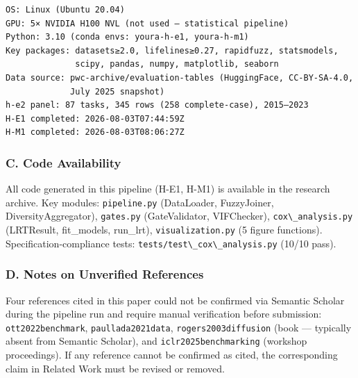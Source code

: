 \begin{verbatim}
OS: Linux (Ubuntu 20.04)
GPU: 5× NVIDIA H100 NVL (not used — statistical pipeline)
Python: 3.10 (conda envs: youra-h-e1, youra-h-m1)
Key packages: datasets≥2.0, lifelines≥0.27, rapidfuzz, statsmodels,
              scipy, pandas, numpy, matplotlib, seaborn
Data source: pwc-archive/evaluation-tables (HuggingFace, CC-BY-SA-4.0,
             July 2025 snapshot)
h-e2 panel: 87 tasks, 345 rows (258 complete-case), 2015–2023
H-E1 completed: 2026-08-03T07:44:59Z
H-M1 completed: 2026-08-03T08:06:27Z
\end{verbatim}

\subsubsection{C. Code Availability}

All code generated in this pipeline (H-E1, H-M1) is available in the research archive. Key modules: \texttt{pipeline.py} (DataLoader, FuzzyJoiner, DiversityAggregator), \texttt{gates.py} (GateValidator, VIFChecker), \texttt{cox\textbackslash \_analysis.py} (LRTResult, fit\_models, run\_lrt), \texttt{visualization.py} (5 figure functions). Specification-compliance tests: \texttt{tests/test\textbackslash \_cox\textbackslash \_analysis.py} (10/10 pass).

\subsubsection{D. Notes on Unverified References}

Four references cited in this paper could not be confirmed via Semantic Scholar during the pipeline run and require manual verification before submission: \texttt{ott2022benchmark}, \texttt{paullada2021data}, \texttt{rogers2003diffusion} (book --- typically absent from Semantic Scholar), and \texttt{iclr2025benchmarking} (workshop proceedings). If any reference cannot be confirmed as cited, the corresponding claim in Related Work must be revised or removed.
